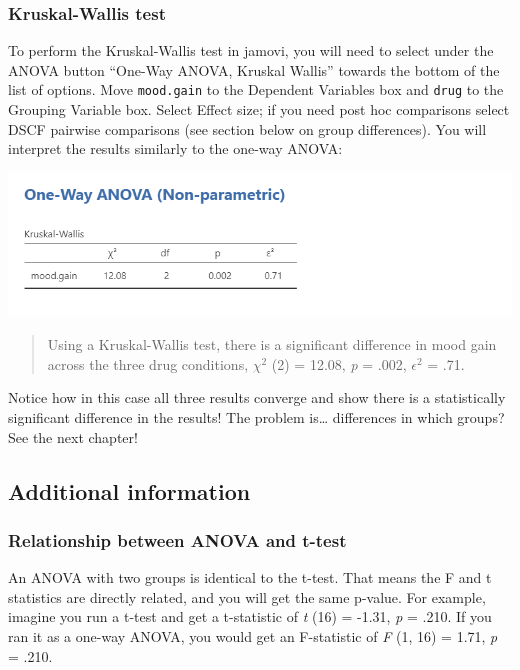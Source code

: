 \documentclass[
]{book}
\begin{document}
\hypertarget{kruskal-wallis-test}{%
\subsubsection{Kruskal-Wallis test}\label{kruskal-wallis-test}}

To perform the Kruskal-Wallis test in jamovi, you will need to select under the ANOVA button ``One-Way ANOVA, Kruskal Wallis'' towards the bottom of the list of options. Move \texttt{mood.gain} to the Dependent Variables box and \texttt{drug} to the Grouping Variable box. Select Effect size; if you need post hoc comparisons select DSCF pairwise comparisons (see section below on group differences). You will interpret the results similarly to the one-way ANOVA:

\includegraphics{images/04_one-way-anova/one-way_results_Kruskal.png}

\begin{quote}
Using a Kruskal-Wallis test, there is a significant difference in mood gain across the three drug conditions, \(\chi^2\) (2) = 12.08, \emph{p} = .002, \(\epsilon^2\) = .71.
\end{quote}

Notice how in this case all three results converge and show there is a statistically significant difference in the results! The problem is\ldots{} differences in which groups? See the next chapter!

\hypertarget{additional-information-3}{%
\subsection{Additional information}\label{additional-information-3}}

\hypertarget{relationship-between-anova-and-t-test}{%
\subsubsection{Relationship between ANOVA and t-test}\label{relationship-between-anova-and-t-test}}

An ANOVA with two groups is identical to the t-test. That means the F and t statistics are directly related, and you will get the same p-value. For example, imagine you run a t-test and get a t-statistic of \emph{t} (16) = -1.31, \emph{p} = .210. If you ran it as a one-way ANOVA, you would get an F-statistic of \emph{F} (1, 16) = 1.71, \emph{p} = .210.
\end{document}
